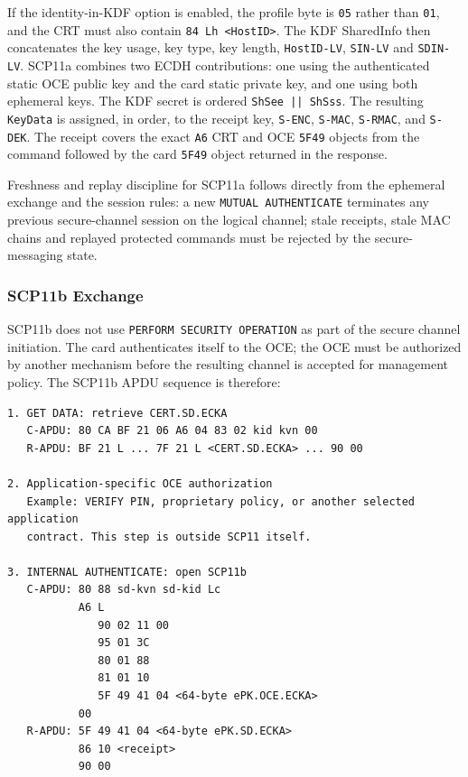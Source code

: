 If the identity-in-KDF option is enabled, the profile byte is
\texttt{05} rather than \texttt{01}, and the CRT must also contain
\texttt{84 Lh <HostID>}. The KDF SharedInfo then concatenates the key usage,
key type, key length, \texttt{HostID-LV}, \texttt{SIN-LV} and
\texttt{SDIN-LV}. SCP11a combines two ECDH contributions: one using the
authenticated static OCE public key and the card static private key, and one
using both ephemeral keys. The KDF secret is ordered
\texttt{ShSee || ShSss}. The resulting \texttt{KeyData} is assigned, in
order, to the receipt key, \texttt{S-ENC}, \texttt{S-MAC},
\texttt{S-RMAC}, and \texttt{S-DEK}. The receipt covers the exact
\texttt{A6} CRT and OCE \texttt{5F49} objects from the command followed by
the card \texttt{5F49} object returned in the response.

Freshness and replay discipline for SCP11a follows directly from the ephemeral
exchange and the session rules: a new \texttt{MUTUAL AUTHENTICATE} terminates
any previous secure-channel session on the logical channel; stale receipts,
stale MAC chains and replayed protected commands must be rejected by the
secure-messaging state.

\subsubsection{SCP11b Exchange}

SCP11b does not use \texttt{PERFORM SECURITY OPERATION} as part of the secure
channel initiation. The card authenticates itself to the OCE; the OCE must be
authorized by another mechanism before the resulting channel is accepted for
management policy. The SCP11b APDU sequence is therefore:

\begin{verbatim}
1. GET DATA: retrieve CERT.SD.ECKA
   C-APDU: 80 CA BF 21 06 A6 04 83 02 kid kvn 00
   R-APDU: BF 21 L ... 7F 21 L <CERT.SD.ECKA> ... 90 00

2. Application-specific OCE authorization
   Example: VERIFY PIN, proprietary policy, or another selected application
   contract. This step is outside SCP11 itself.

3. INTERNAL AUTHENTICATE: open SCP11b
   C-APDU: 80 88 sd-kvn sd-kid Lc
           A6 L
              90 02 11 00
              95 01 3C
              80 01 88
              81 01 10
              5F 49 41 04 <64-byte ePK.OCE.ECKA>
           00
   R-APDU: 5F 49 41 04 <64-byte ePK.SD.ECKA>
           86 10 <receipt>
           90 00
\end{verbatim}

